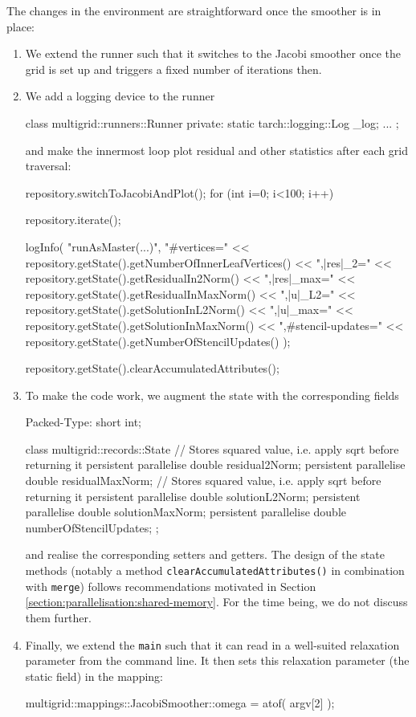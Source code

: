 The changes in the environment are straightforward once the smoother is 
in place:
\begin{enumerate}
  \item We extend the runner such that it switches to the Jacobi smoother once 
  the grid is set up and triggers a fixed number of iterations then.
  \item We add a logging device to the runner
  \begin{code}
    class multigrid::runners::Runner {
      private:
        static tarch::logging::Log  _log;
        ...
    };
  \end{code}
  and make the innermost loop plot residual and other statistics after each 
  grid traversal:
  \begin{code}
  repository.switchToJacobiAndPlot();
  for (int i=0; i<100; i++) {
    repository.iterate();

    logInfo(
      "runAsMaster(...)",
      "#vertices=" << repository.getState().getNumberOfInnerLeafVertices() <<
      ",|res|_2=" << repository.getState().getResidualIn2Norm() <<
      ",|res|_max=" << repository.getState().getResidualInMaxNorm() <<
      ",|u|_L2=" << repository.getState().getSolutionInL2Norm() <<
      ",|u|_max=" << repository.getState().getSolutionInMaxNorm() <<
      ",#stencil-updates=" << repository.getState().getNumberOfStencilUpdates()
    );

    repository.getState().clearAccumulatedAttributes();
  }
  \end{code}
  \item To make the code work, we augment the state with the corresponding
  fields 
  \begin{code}
Packed-Type: short int;

class multigrid::records::State {  
  // Stores squared value, i.e. apply sqrt before returning it
  persistent parallelise double residual2Norm;
  persistent parallelise double residualMaxNorm;
  // Stores squared value, i.e. apply sqrt before returning it
  persistent parallelise double solutionL2Norm;
  persistent parallelise double solutionMaxNorm;
  persistent parallelise double numberOfStencilUpdates;
};
  \end{code}
  and realise the corresponding setters and getters. The design of the state
  methods (notably a method \texttt{clearAccumulatedAttributes()} in
  combination with \texttt{merge}) follows recommendations motivated in Section
  \ref{section:parallelisation:shared-memory}. For the time being, we do not
  discuss them further.
  \item Finally, we extend the \texttt{main} such that it can read in a
  well-suited relaxation parameter from the command line. It then sets this
  relaxation parameter (the static field) in the mapping:
  \begin{code}
    multigrid::mappings::JacobiSmoother::omega = atof( argv[2] );
  \end{code}
\end{enumerate}


